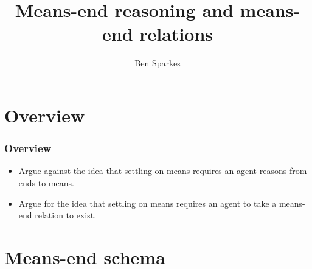 \documentclass[noamssymb, compress, handout]{beamer} %
\title{Means-end reasoning and means-end relations}
\author{Ben Sparkes}
\begin{document}
\begin{frame}[noframenumbering]
  \titlepage
\end{frame}


\section*{Overview}
\label{sec:overview}

\begin{frame}
  \frametitle{Overview}

  \begin{itemize}
  \item Argue against the idea that settling on means requires an agent reasons from ends to means.
  \item Argue for the idea that settling on means requires an agent to take a means-end relation to exist.
  \end{itemize}
\end{frame}


\section{Means-end schema}
\label{sec:schema}






\end{document}
